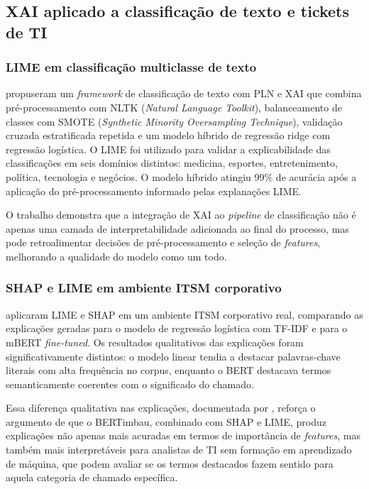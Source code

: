 \documentclass[
    12pt,                %
    openright,           %
    oneside,             %
    a4paper,             %
    english,             %
    brazil               %
]{abntex2}
\begin{document}
\subsection{XAI aplicado a classificação de texto e tickets de TI}
\label{subsec:xai_aplicado}

\subsubsection{LIME em classificação multiclasse de texto}
\label{subsubsec:xai_mustafa}

 propuseram um \textit{framework} de classificação de texto com PLN e XAI que combina pré-processamento com NLTK (\textit{Natural Language Toolkit}), balanceamento de classes com SMOTE (\textit{Synthetic Minority Oversampling Technique}), validação cruzada estratificada repetida e um modelo híbrido de regressão ridge com regressão logística. O LIME foi utilizado para validar a explicabilidade das classificações em seis domínios distintos: medicina, esportes, entretenimento, política, tecnologia e negócios. O modelo híbrido atingiu 99\% de acurácia após a aplicação do pré-processamento informado pelas explanações LIME.

O trabalho demonstra que a integração de XAI ao \textit{pipeline} de classificação não é apenas uma camada de interpretabilidade adicionada ao final do processo, mas pode retroalimentar decisões de pré-processamento e seleção de \textit{features}, melhorando a qualidade do modelo como um todo.

\subsubsection{SHAP e LIME em ambiente ITSM corporativo}
\label{subsubsec:xai_razma}

 aplicaram LIME e SHAP em um ambiente ITSM corporativo real, comparando as explicações geradas para o modelo de regressão logística com TF-IDF e para o mBERT \textit{fine-tuned}. Os resultados qualitativos das explicações foram significativamente distintos: o modelo linear tendia a destacar palavras-chave literais com alta frequência no corpus, enquanto o BERT destacava termos semanticamente coerentes com o significado do chamado.

Essa diferença qualitativa nas explicações, documentada por , reforça o argumento de que o BERTimbau, combinado com SHAP e LIME, produz explicações não apenas mais acuradas em termos de importância de \textit{features}, mas também mais interpretáveis para analistas de TI sem formação em aprendizado de máquina, que podem avaliar se os termos destacados fazem sentido para aquela categoria de chamado específica.
\end{document}
